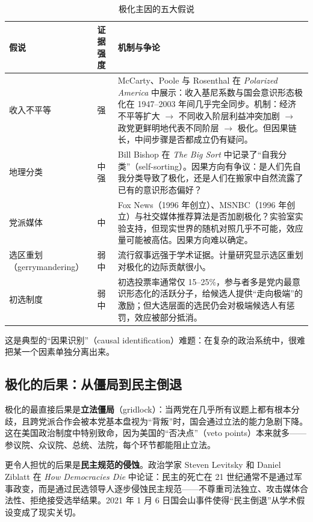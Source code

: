 \documentclass[12pt,a4paper]{ctexart}
\begin{document}
\begin{table}[h]
\centering
\caption{极化主因的五大假说}
\begin{tabular}{@{}lp{4.6cm}p{7.6cm}@{}}
\toprule
\textbf{假说} & \textbf{证据强度} & \textbf{机制与争论} \\
\midrule
收入不平等 & 强 & McCarty、Poole 与 Rosenthal 在 \emph{Polarized America} 中展示：收入基尼系数与国会意识形态极化在 1947--2003 年间几乎完全同步。机制：经济不平等扩大 $\rightarrow$ 不同收入阶层利益冲突加剧 $\rightarrow$ 政党更鲜明地代表不同阶层 $\rightarrow$ 极化。但因果链长，中间步骤是否都成立仍有疑问。 \\
地理分类 & 中强 & Bill Bishop 在 \emph{The Big Sort} 中记录了``自我分类''（self-sorting）。因果方向有争议：是人们先自我分类导致了极化，还是人们在搬家中自然流露了已有的意识形态偏好？ \\
党派媒体 & 中 & Fox News（1996 年创立）、MSNBC（1996 年创立）与社交媒体推荐算法是否加剧极化？实验室实验支持，但现实世界的随机对照几乎不可能，效应量可能被高估。因果方向难以确定。 \\
选区重划（gerrymandering） & 弱中 & 流行叙事远强于学术证据。计量研究显示选区重划对极化的边际贡献很小。 \\
初选制度 & 弱中 & 初选投票率通常仅 15--25\%，参与者多是党内最意识形态化的活跃分子，给候选人提供``走向极端''的激励；但大选层面的选民仍会对极端候选人有惩罚，效应被部分抵消。 \\
\bottomrule
\end{tabular}
\end{table}

这是典型的``因果识别''（causal identification）难题：在复杂的政治系统中，很难把某一个因素单独分离出来。

\subsection{极化的后果：从僵局到民主倒退}

极化的最直接后果是\textbf{立法僵局}（gridlock）：当两党在几乎所有议题上都有根本分歧，且跨党派合作会被本党基本盘视为``背叛''时，国会通过立法的能力急剧下降。这在美国政治制度中特别致命，因为美国的``否决点''（veto points）本来就多——参议院、众议院、总统、法院，每个环节都能阻止立法。

更令人担忧的后果是\textbf{民主规范的侵蚀}。政治学家 Steven Levitsky 和 Daniel Ziblatt 在 \emph{How Democracies Die} 中论证：民主的死亡在 21 世纪通常不是通过军事政变，而是通过民选领导人逐步侵蚀民主规范——不尊重司法独立、攻击媒体合法性、拒绝接受选举结果。2021 年 1 月 6 日国会山事件使得``民主倒退''从学术假设变成了现实关切。
\end{document}
